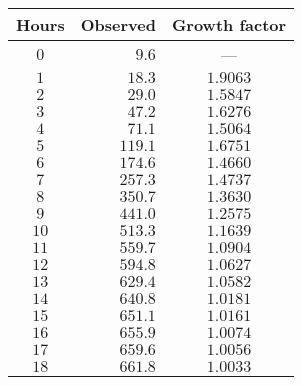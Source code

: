 \begin{tabular}{crc}               \toprule
Hours & Observed & Growth factor \\\midrule
$0$   & $9.6$    & ---           \\
$1$   & $18.3$   & $1.9063$      \\
$2$   & $29.0$   & $1.5847$      \\
$3$   & $47.2$   & $1.6276$      \\
$4$   & $71.1$   & $1.5064$      \\
$5$   & $119.1$  & $1.6751$      \\
$6$   & $174.6$  & $1.4660$      \\
$7$   & $257.3$  & $1.4737$      \\
$8$   & $350.7$  & $1.3630$      \\
$9$   & $441.0$  & $1.2575$      \\
$10$  & $513.3$  & $1.1639$      \\
$11$  & $559.7$  & $1.0904$      \\
$12$  & $594.8$  & $1.0627$      \\
$13$  & $629.4$  & $1.0582$      \\
$14$  & $640.8$  & $1.0181$      \\
$15$  & $651.1$  & $1.0161$      \\
$16$  & $655.9$  & $1.0074$      \\
$17$  & $659.6$  & $1.0056$      \\
$18$  & $661.8$  & $1.0033$      \\\bottomrule
\end{tabular}

